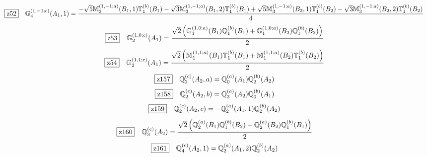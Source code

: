\documentclass[fleqn,10pt,landscape]{jsarticle}
\begin{document}
\begin{dmath*}
\hspace*{3mm}\fbox{z52}\quad \mathbb{G}_{4}^{(1,-1;c)}(A_{1},1)=\frac{- \sqrt{5} \mathbb{M}_{3}^{(1,-1;a)}(B_{1},1) \mathbb{T}_{1}^{(b)}(B_{1}) - \sqrt{3} \mathbb{M}_{3}^{(1,-1;a)}(B_{1},2) \mathbb{T}_{1}^{(b)}(B_{1}) + \sqrt{5} \mathbb{M}_{3}^{(1,-1;a)}(B_{2},1) \mathbb{T}_{1}^{(b)}(B_{2}) - \sqrt{3} \mathbb{M}_{3}^{(1,-1;a)}(B_{2},2) \mathbb{T}_{1}^{(b)}(B_{2})}{4}
\end{dmath*}
\begin{dmath*}
\hspace*{3mm}\fbox{z53}\quad \mathbb{G}_{2}^{(1,0;c)}(A_{1})=\frac{\sqrt{2} \left(\mathbb{G}_{1}^{(1,0;a)}(B_{1}) \mathbb{Q}_{1}^{(b)}(B_{1}) + \mathbb{G}_{1}^{(1,0;a)}(B_{2}) \mathbb{Q}_{1}^{(b)}(B_{2})\right)}{2}
\end{dmath*}
\begin{dmath*}
\hspace*{3mm}\fbox{z54}\quad \mathbb{G}_{2}^{(1,1;c)}(A_{1})=\frac{\sqrt{2} \left(\mathbb{M}_{1}^{(1,1;a)}(B_{1}) \mathbb{T}_{1}^{(b)}(B_{1}) + \mathbb{M}_{1}^{(1,1;a)}(B_{2}) \mathbb{T}_{1}^{(b)}(B_{2})\right)}{2}
\end{dmath*}
\begin{dmath*}
\hspace*{3mm}\fbox{z157}\quad \mathbb{Q}_{2}^{(c)}(A_{2},a)=\mathbb{Q}_{0}^{(a)}(A_{1}) \mathbb{Q}_{2}^{(b)}(A_{2})
\end{dmath*}
\begin{dmath*}
\hspace*{3mm}\fbox{z158}\quad \mathbb{Q}_{2}^{(c)}(A_{2},b)=\mathbb{Q}_{2}^{(a)}(A_{2}) \mathbb{Q}_{0}^{(b)}(A_{1})
\end{dmath*}
\begin{dmath*}
\hspace*{3mm}\fbox{z159}\quad \mathbb{Q}_{2}^{(c)}(A_{2},c)=- \mathbb{Q}_{2}^{(a)}(A_{1},1) \mathbb{Q}_{2}^{(b)}(A_{2})
\end{dmath*}
\begin{dmath*}
\hspace*{3mm}\fbox{z160}\quad \mathbb{Q}_{3}^{(c)}(A_{2})=\frac{\sqrt{2} \left(\mathbb{Q}_{2}^{(a)}(B_{1}) \mathbb{Q}_{1}^{(b)}(B_{2}) + \mathbb{Q}_{2}^{(a)}(B_{2}) \mathbb{Q}_{1}^{(b)}(B_{1})\right)}{2}
\end{dmath*}
\begin{dmath*}
\hspace*{3mm}\fbox{z161}\quad \mathbb{Q}_{4}^{(c)}(A_{2},1)=\mathbb{Q}_{2}^{(a)}(A_{1},2) \mathbb{Q}_{2}^{(b)}(A_{2})
\end{dmath*}
\end{document}
